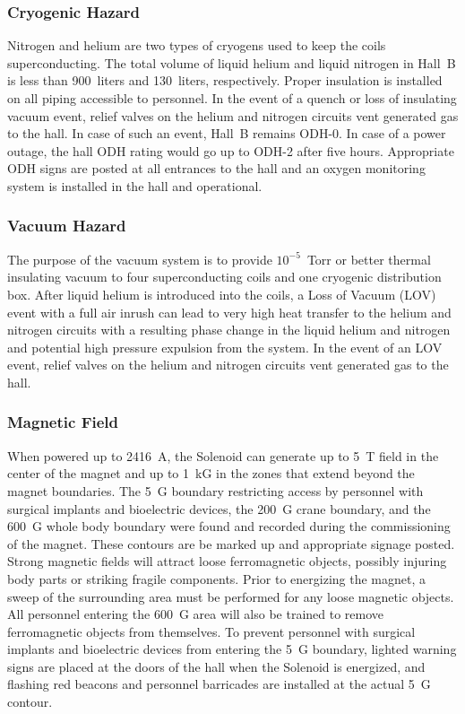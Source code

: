 \subsubsection{Cryogenic Hazard}

Nitrogen and helium are two types of cryogens used to keep the coils superconducting. The 
total volume of liquid helium and liquid nitrogen in Hall~B is less than 900~liters and 
130~liters, respectively. Proper insulation is installed on all piping accessible to 
personnel. In the event of a quench or loss of insulating vacuum event, relief valves on 
the helium and nitrogen circuits vent generated gas to the hall. In case of such an event, 
Hall~B remains ODH-0. In case of a power outage, the hall ODH rating would go up to ODH-2 
after five hours. Appropriate ODH signs are posted at all entrances to the hall and an 
oxygen monitoring system is installed in the hall and operational.

\subsubsection{Vacuum Hazard}

The purpose of the vacuum system is to provide $10^{-5}$~Torr or better thermal insulating 
vacuum to four superconducting coils and one cryogenic distribution box. After liquid helium 
is introduced into the coils, a Loss of Vacuum (LOV) event with a full air inrush can lead to
very high heat transfer to the helium and nitrogen circuits with a resulting phase change in 
the liquid helium and nitrogen and potential high pressure expulsion from the system. In the 
event of an LOV event, relief valves on the helium and nitrogen circuits vent generated
gas to the hall.

\subsubsection{Magnetic Field}

When powered up to 2416~A, the Solenoid can generate up to 5~T field in the center of the 
magnet and up to 1~kG in the zones that extend beyond the magnet boundaries. The 5~G 
boundary restricting access by personnel with surgical implants and bioelectric devices, 
the 200~G crane boundary, and the 600~G whole body boundary were found and recorded during 
the commissioning of the magnet. These contours are be marked up and appropriate signage 
posted. Strong magnetic fields will attract loose ferromagnetic objects, possibly injuring 
body parts or striking fragile components. Prior to energizing the magnet, a sweep of the
surrounding area must be performed for any loose magnetic objects. All personnel entering 
the 600~G area will also be trained to remove ferromagnetic objects from themselves. To 
prevent personnel with surgical implants and bioelectric devices from entering the 5~G
boundary, lighted warning signs are placed at the doors of the hall when the Solenoid is 
energized, and flashing red beacons and personnel barricades are installed at the actual 5~G 
contour.

